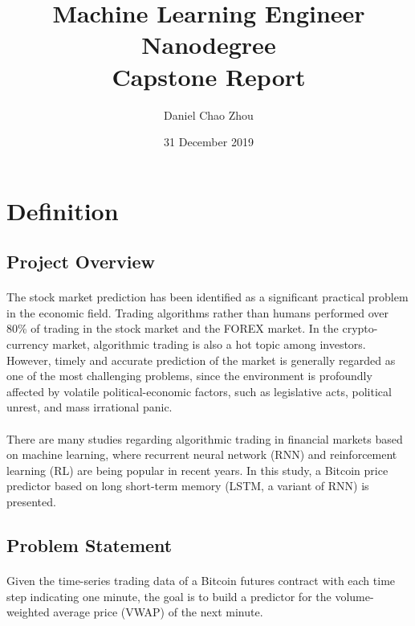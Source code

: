 \documentclass[12pt, letterpaper]{article}
\title{Machine Learning Engineer Nanodegree\\Capstone Report}
\author{Daniel Chao Zhou}
\date{31 December 2019}
\begin{document}
\maketitle

\section{Definition} %

\subsection{Project Overview}

\paragraph{}
The stock market prediction has been identified as a significant practical problem in the economic field. Trading algorithms rather than humans performed over 80\% of trading in the stock market and the FOREX market. In the crypto-currency market, algorithmic trading is also a hot topic among investors. However, timely and accurate prediction of the market is generally regarded as one of the most challenging problems, since the environment is profoundly affected by volatile political-economic factors, such as legislative acts, political unrest, and mass irrational panic.

\paragraph{}
There are many studies regarding algorithmic trading in financial markets based on machine learning, where recurrent neural network (RNN) and reinforcement learning (RL) are being popular in recent years. In this study, a Bitcoin price predictor based on long short-term memory (LSTM, a variant of RNN) is presented.

\subsection{Problem Statement}

\paragraph{}
Given the time-series trading data of a Bitcoin futures contract with each time step indicating one minute, the goal is to build a predictor for the volume-weighted average price (VWAP) of the next minute.
\end{document}

